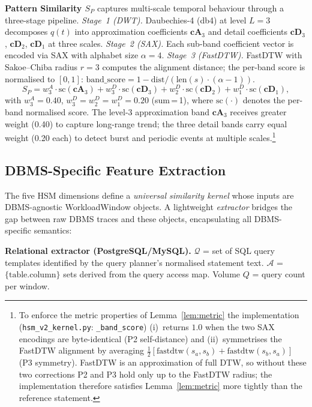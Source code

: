 \documentclass[10pt,journal,compsoc]{IEEEtran}
\newcommand{\SPER}{S_{P}}
\begin{document}
\textbf{Pattern Similarity $\SPER$} captures multi-scale temporal
behaviour through a three-stage pipeline. \emph{Stage~1 (DWT).}
Daubechies-4 (db4) at level $L\!=\!3$ decomposes $q(t)$ into
approximation coefficients $\mathbf{cA}_3$ and detail coefficients
$\mathbf{cD}_3$, $\mathbf{cD}_2$, $\mathbf{cD}_1$ at three scales.
\emph{Stage~2 (SAX).} Each sub-band coefficient vector
is encoded via SAX with alphabet size $\alpha\!=\!4$. \emph{Stage~3
(FastDTW).} FastDTW with Sakoe--Chiba radius $r\!=\!3$ computes the
alignment distance; the per-band score is normalised to $[0,1]$:
$\mathrm{band\_score}=1-\mathrm{dist}/({\mathrm{len}(s)\cdot(\alpha-1)})$.
\begin{equation}
  \SPER = w_3^A\!\cdot\!\mathrm{sc}(\mathbf{cA}_3)
         +w_3^D\!\cdot\!\mathrm{sc}(\mathbf{cD}_3)
         +w_2^D\!\cdot\!\mathrm{sc}(\mathbf{cD}_2)
         +w_1^D\!\cdot\!\mathrm{sc}(\mathbf{cD}_1),
\end{equation}
with $w_3^A\!=\!0.40$, $w_3^D\!=\!w_2^D\!=\!w_1^D\!=\!0.20$
(sum\,=\,1), where $\mathrm{sc}(\cdot)$ denotes the per-band normalised
score. The level-3 approximation band $\mathbf{cA}_3$ receives greater
weight (0.40) to capture long-range trend; the three detail bands carry
equal weight (0.20 each) to detect burst and periodic events at
multiple scales.\footnote{To enforce the metric properties of
Lemma~\ref{lem:metric} the implementation (\texttt{hsm\_v2\_kernel.py}:
\texttt{\_band\_score}) (i)~returns $1.0$ when the two SAX encodings
are byte-identical (P2 self-distance) and (ii)~symmetrises the
FastDTW alignment by averaging
$\tfrac{1}{2}[\mathrm{fastdtw}(s_a,s_b)+\mathrm{fastdtw}(s_b,s_a)]$
(P3 symmetry). FastDTW is an approximation of full DTW, so without
these two corrections P2 and P3 hold only up to the FastDTW radius;
the implementation therefore satisfies Lemma~\ref{lem:metric} more
tightly than the reference statement.}

\subsection{DBMS-Specific Feature Extraction}\label{sec:extractor}

The five HSM dimensions define a \emph{universal similarity kernel}
whose inputs are DBMS-agnostic WorkloadWindow objects.
A lightweight \emph{extractor} bridges the gap between raw DBMS traces
and these objects, encapsulating all DBMS-specific semantics:

\smallskip
\noindent\textbf{Relational extractor (PostgreSQL/MySQL).}
$\mathcal{Q}$ = set of SQL query templates identified by the query
planner's normalised statement text.
$\mathcal{A}$ = $\{\text{table}.\text{column}\}$ sets derived from the
query access map.
Volume $Q$ = query count per window.
\end{document}
